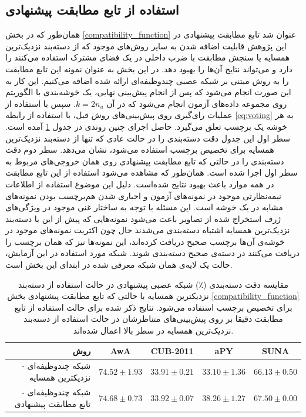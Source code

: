 \subsection{استفاده از تابع مطابقت پیشنهادی}\label{exp:nn_comp}
همان‌طور که در بخش \ref{compatibility_function} عنوان شد تابع مطابقت پیشنهادی  در این پژوهش قابلیت اضافه شدن به سایر روش‌های موجود که از دسته‌بند نزدیک‌ترین همسایه یا سنجش مطابقت با ضرب داخلی در یک فضای مشترک استفاده می‌کنند را دارد و می‌تواند نتایج آن‌ها را بهبود دهد. در این بخش به عنوان نمونه این تابع مطابقت را به روش مبتنی بر شبکه عصبی چندوظیفه‌ای ارائه شده اضافه می‌کنیم. این کار به این صورت انجام می‌شود که پس از انجام پیش‌بینی نهایی، یک خوشه‌بندی با الگوریتم  روی مجموعه داده‌های آزمون انجام می‌شود که در آن $k=2n_u$. سپس با استفاده از عملیات رای‌گیری روی پیش‌بینی‌های روش قبل، با استفاده از رابطه \eqref{eq:voting} به هر خوشه یک برچسب تعلق می‌گیرد. حاصل اجرای چنین روندی در جدول \ref{tab:nn_comp} آمده است. سطر اول این جدول دقت دسته‌بندی را در حالت عادی که تنها از دسته‌بند نزدیک‌ترین همسایه برای تخصیص برچسب استفاده می‌شود، نشان می‌دهد. سطر دوم دقت دسته‌بندی را در حالتی که تابع مطابقت پیشنهادی روی همان خروجی‌های مربوط به سطر اول اجرا شده است. همان‌طور که مشاهده می‌شود استفاده از این تابع مطابقت در همه موارد باعث بهبود نتایج شده‌است. دلیل این موضوع استفاده از اطلاعات نیمه‌نظارتی موجود در نمونه‌های آزمون و  اجباری شدن هم‌برچسب بودن نمونه‌های مشابه در یک خوشه است.  این مسئله با توجه به ساختار غنی موجود در ویژگی‌های ژرف استخراج شده از تصاویر باعث می‌شود نمونه‌هایی که پیش از این با دسته‌بند نزدیک‌ترین همسایه اشتباه دسته‌بندی می‌شدند حال چون اکثریت نمونه‌های موجود در خوشه‌ی آن‌ها برچسب صحیح دریافت کرده‌اند، این نمونه‌ها نیز که همان برچسب را دریافت می‌کنند در دسته‌ی صحیح دسته‌بندی شوند.
 شبکه مورد استفاده در این آزمایش، حالت یک لایه‌ی همان شبکه معرفی شده در ابتدای این بخش است.
\begin{table}[t]
\caption [دقت دسته‌بندی با شبکه عصبی به همراه تابع مطابقت پیشنهادی]{
مقایسه دقت دسته‌بندی (٪) شبکه عصبی پیشنهادی در حالت استفاده از دسته‌بند نزدیکترین همسایه با حالتی که تابع مطابقت پیشنهادی بخش  \ref{compatibility_function} برای تخصیص برچسب استفاده می‌شود.
نتایج ذکر شده برای حالت استفاده از تابع مطابقت دقیقا بر روی پیش‌بینی‌های متناظرشان در حالت استفاده از دسته‌بند نزدیک‌ترین همسایه در سطر بالا اعمال شده‌اند.
}
\label{tab:nn_comp}
\begin{center}
\begin{tabular}{|r|c|c|c|c|}
\hline
روش  & AwA & CUB-2011 & aPY & SUNA \\
\hline
شبکه چندوظیفه‌ای - نزدیکترین همسایه
                & {${74.52 \pm 1.93}$}  & {${33.91 \pm 0.21}$} & ${33.10 \pm 1.36}$ & { ${66.13 \pm 0.50}$} \\ \hline
شبکه  چندوظیفه‌ای - تابع مطابقت پیشنهادی
                      & $74.68 \pm 0.73$  & \textbf{${33.92 \pm 0.07}$} & \textbf{${38.26 \pm 1.27}$} & \textbf{ ${67.50 \pm 0.00}$} \\ \hline
\end{tabular}

\end{center}
\end{table}

